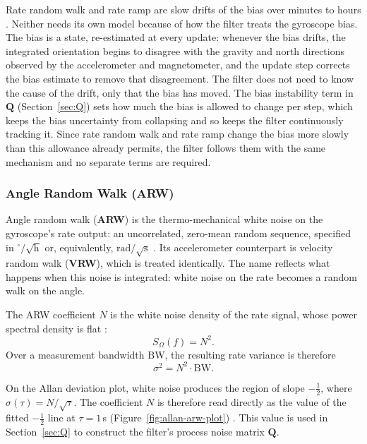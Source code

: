 \documentclass[12pt,a4paper]{article}
\newcommand{\bQ}{\bm{Q}}
\begin{document}
Rate random walk and rate ramp are slow drifts of the bias over
minutes to hours \citep{elsheimy2008allan}. Neither needs its own
model because of how the filter treats the gyroscope bias. The bias
is a state, re-estimated at every update: whenever the bias drifts,
the integrated orientation begins to disagree with the gravity and
north directions observed by the accelerometer and magnetometer,
and the update step corrects the bias estimate to remove that
disagreement. The filter does not need to know the cause of the
drift, only that the bias has moved. The bias instability term in
$\bQ$ (Section~\ref{sec:Q}) sets how much the bias is allowed to
change per step, which keeps the bias uncertainty from collapsing
and so keeps the filter continuously tracking it. Since rate random
walk and rate ramp change the bias more slowly than this allowance
already permits, the filter follows them with the same mechanism
and no separate terms are required. 


\subsubsection{Angle Random Walk (ARW)}

Angle random walk (\textbf{ARW}) is the thermo-mechanical white
noise on the gyroscope's rate output: an uncorrelated, zero-mean
random sequence, specified in $^{\circ}/\sqrt{\text{h}}$ or,
equivalently, $\text{rad}/\sqrt{\text{s}}$
\citep{barredapupo2016characterization}. Its accelerometer
counterpart is velocity random walk (\textbf{VRW}), which is
treated identically. The name reflects what happens when this noise
is integrated: white noise on the rate becomes a random walk on the
angle.

The ARW coefficient $N$ is the white noise density of the rate
signal, whose power spectral density is flat
\citep{ieee952_1997}:
\begin{equation}
  S_\Omega(f) = N^2 .
  \label{eq:white-noise-density}
\end{equation}
Over a measurement bandwidth $\text{BW}$, the resulting rate
variance is therefore
\begin{equation}
  \sigma^2 = N^2 \cdot \text{BW}.
  \label{eq:arw-variance}
\end{equation}

On the Allan deviation plot, white noise produces the region of
slope $-\tfrac{1}{2}$, where
$\sigma(\tau) = N/\sqrt{\tau}$. The coefficient $N$ is therefore
read directly as the value of the fitted $-\tfrac{1}{2}$ line at
$\tau = 1$\,s (Figure~\ref{fig:allan-arw-plot})
\citep{ieee952_1997}. This value is used in Section~\ref{sec:Q} to
construct the filter's process noise matrix $\bQ$.
\end{document}
